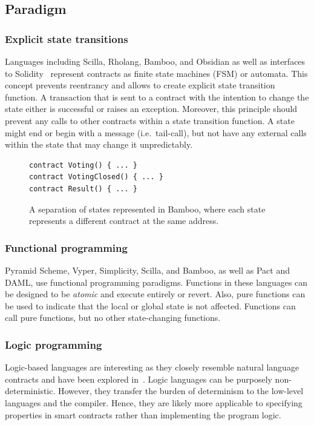 \subsection{Paradigm}

\subsubsection{Explicit state transitions}
Languages including Scilla, Rholang, Bamboo, and Obsidian as well as interfaces to Solidity~\cite{Mavridou2018} represent contracts as finite state machines (FSM) or automata. This concept prevents reentrancy and allows to create explicit state transition function. A transaction that is sent to a contract with the intention to change the state either is successful or raises an exception. Moreover, this principle should prevent any calls to other contracts within a state transition function. A state might end or begin with a message (i.e.\ tail-call), but not have any external calls within the state that may change it unpredictably.

\begin{figure}[!h]
\begin{lstlisting}[language=Solidity]
contract Voting() { ... }
contract VotingClosed() { ... }
contract Result() { ... }
\end{lstlisting}
\caption{A separation of states represented in Bamboo, where each state represents a different contract at the same address.}
\label{lst:fsm}
\end{figure}

\subsubsection{Functional programming}
Pyramid Scheme, Vyper, Simplicity, Scilla, and Bamboo, as well as Pact and DAML, use functional programming paradigms. Functions in these languages can be designed to be \emph{atomic} and execute entirely or revert. Also, pure functions can be used to indicate that the local or global state is not affected. Functions can call pure functions, but no other state-changing functions.

\subsubsection{Logic programming}
Logic-based languages are interesting as they closely resemble natural language contracts and have been explored in~\cite{Idelberger2016}. Logic languages can be purposely non-deterministic. However, they transfer the burden of determinism to the low-level languages and the compiler. Hence, they are likely more applicable to specifying properties in smart contracts rather than implementing the program logic.


